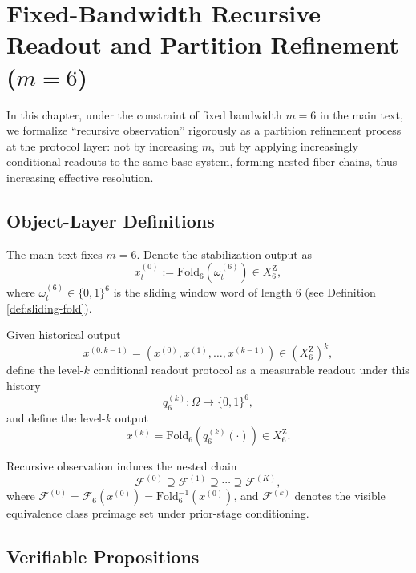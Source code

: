 \section{Fixed-Bandwidth Recursive Readout and Partition Refinement (\texorpdfstring{$m=6$}{m=6})}

In this chapter, under the constraint of fixed bandwidth $m=6$ in the main text, we formalize ``recursive observation'' rigorously as a partition refinement process at the protocol layer: not by increasing $m$, but by applying increasingly conditional readouts to the same base system, forming nested fiber chains, thus increasing effective resolution.

\subsection{Object-Layer Definitions}

\begin{definition}\label{def:rec-level0}
The main text fixes $m=6$. Denote the stabilization output as
$$
x^{(0)}_t:=\mathrm{Fold}_6(\omega_t^{(6)})\in X_6^{\mathrm Z},
$$
where $\omega_t^{(6)}\in\{0,1\}^6$ is the sliding window word of length $6$ (see Definition \ref{def:sliding-fold}).
\end{definition}

\begin{definition}\label{def:rec-levelk}
Given historical output
$$
x^{(0:k-1)}=(x^{(0)},x^{(1)},\dots,x^{(k-1)})\in (X_6^{\mathrm Z})^{k},
$$
define the level-$k$ conditional readout protocol as a measurable readout under this history
$$
q_6^{(k)}:\Omega\to \{0,1\}^6,
$$
and define the level-$k$ output
$$
x^{(k)}=\mathrm{Fold}_6\!\left(q_6^{(k)}(\cdot)\right)\in X_6^{\mathrm Z}.
$$
\end{definition}

\begin{definition}\label{def:rec-nested-fibers}
Recursive observation induces the nested chain
$$
\mathcal{F}^{(0)}\supseteq \mathcal{F}^{(1)}\supseteq \cdots \supseteq \mathcal{F}^{(K)},
$$
where $\mathcal{F}^{(0)}=\mathcal{F}_6(x^{(0)})=\mathrm{Fold}_6^{-1}(x^{(0)})$, and $\mathcal{F}^{(k)}$ denotes the visible equivalence class preimage set under prior-stage conditioning.
\end{definition}

\subsection{Verifiable Propositions}

